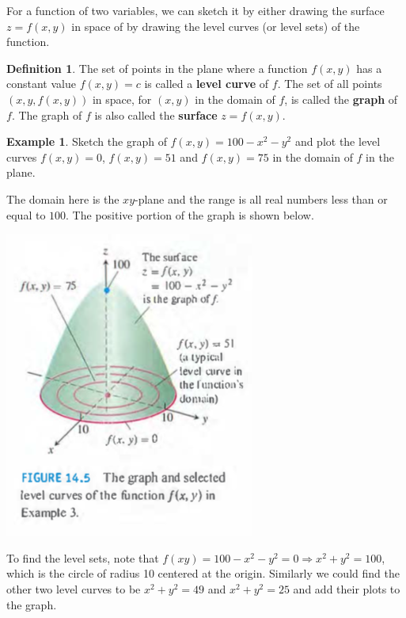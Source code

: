 \documentclass[12pt, letter]{article}
\theoremstyle{plain}
\numberwithin{theorem}{section}
\theoremstyle{definition}
\newtheorem{definition}[theorem]{Definition}
\newtheorem{example}[theorem]{Example}
\begin{document}
\bigskip

\hrulefill

\bigskip

For a function of two variables, we can sketch it by either drawing the surface $z=f(x,y)$ in space of by drawing the level curves (or level sets) of the function.

\bigskip

\begin{definition}
The set of points in the plane where a function $f(x,y)$ has a constant value $f(x,y) = c$ is called a \textbf{level curve} of $f$. The set of all points $(x,y,f(x,y))$ in space, for $(x,y)$ in the domain of $f$, is called the \textbf{graph} of $f$. The graph of $f$ is also called the \textbf{surface} $z=f(x,y)$.

\end{definition}

\bigskip

\hrulefill

\bigskip

\begin{example}
Sketch the graph of $f(x,y) = 100-x^2-y^2$ and plot the level curves $f(x,y) = 0$, $f(x,y) = 51$ and $f(x,y) = 75$ in the domain of $f$ in the plane.

\smallskip

The domain here is the $xy$-plane and the range is all real numbers less than or equal to $100$. The positive portion of the graph is shown below.

\bigskip

\begin{center}
\includegraphics[scale=0.7]{m2_f2}
\end{center}

\bigskip

To find the level sets, note that $f(xy) = 100-x^2-y^2 = 0 \Rightarrow x^2+y^2 = 100$, which is the circle of radius 10 centered at the origin. Similarly we could find the other two level curves to be $x^2+y^2=49$ and $x^2+y^2=25$ and add their plots to the graph.
\end{example}
\end{document}
